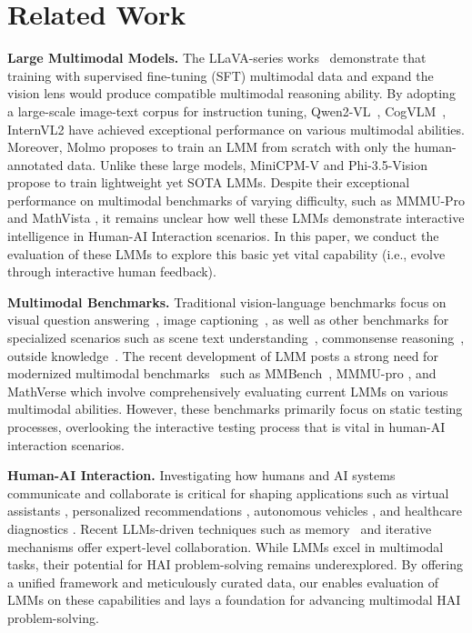 \section{Related Work}
\textbf{Large Multimodal Models.}
The LLaVA-series works~\citep{liu2023llava, llava1.5, liu2024llavanext, llava-onevision} demonstrate that training with supervised fine-tuning (SFT) multimodal data and expand the vision lens would produce compatible multimodal reasoning ability. By adopting a large-scale image-text corpus for instruction tuning, Qwen2-VL~\citep{qwen2-vl}, CogVLM~\citep{wang2023cogvlm}, InternVL2 \citep{internvl2} have achieved exceptional performance on various multimodal abilities. Moreover, Molmo \citep{molmo} proposes to train an LMM from scratch with only the human-annotated data. Unlike these large models, MiniCPM-V \citep{yao2024minicpmvgpt4vlevelmllm} and Phi-3.5-Vision \citep{phi3model} propose to train lightweight yet SOTA LMMs. Despite their exceptional performance on multimodal benchmarks of varying difficulty, such as MMMU-Pro \citep{mmmupro} and MathVista \citep{lu2024mathvista}, it remains unclear how well these LMMs demonstrate interactive intelligence in Human-AI Interaction scenarios. In this paper, we conduct the evaluation of these LMMs to explore this basic yet vital capability (i.e., evolve through interactive human feedback).

\textbf{Multimodal Benchmarks.}
Traditional vision-language benchmarks focus on visual question answering~\citep{VQAv2}, image captioning~\citep{cococaption,flickr_entity,agrawal2019nocaps}, as well as other benchmarks for specialized scenarios such as scene text understanding~\citep{textvqa,sidorov2020textcaps}, commonsense reasoning~\citep{zellers2019recognition}, outside knowledge~\citep{marino2019ok_okvqa,AOKVQA}. The recent development of LMM posts a strong need for modernized multimodal benchmarks~\citep{worldgui,liu2023mmbench,li2023seedbench,yu2023mmvet, yue2024mmmu, lu2024mathvista, mathverse} such as MMBench~\citep{liu2023mmbench}, MMMU-pro \citep{mmmupro}, and MathVerse \citep{mathverse} which involve comprehensively evaluating current LMMs on various multimodal abilities. However, these benchmarks primarily focus on static testing processes, overlooking the interactive testing process that is vital in human-AI interaction scenarios.

\textbf{Human-AI Interaction.}
Investigating how humans and AI systems communicate and collaborate is critical for shaping applications such as virtual assistants \citep{virvou2022emerging}, personalized recommendations \citep{dodeja2024towards}, autonomous vehicles \citep{zhang2021human}, and healthcare diagnostics \citep{mckinney2020international}. Recent LLMs-driven techniques such as memory~\citep{park2023generative} and iterative~\citep{zhang2023human} mechanisms offer expert-level collaboration. While LMMs \citep{molmo,qwen2-vl} excel in multimodal tasks, their potential for HAI problem-solving \citep{worldgui, swebenchmm, li2024mediq} remains underexplored. By offering a unified framework and meticulously curated data, our \bench{} enables evaluation of LMMs on these capabilities and lays a foundation for advancing multimodal HAI problem-solving.

